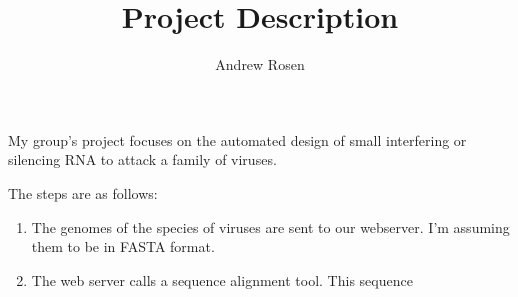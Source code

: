 \documentclass[10pt,a4paper]{article}
\author{Andrew Rosen}
\title{Project Description}
\begin{document}
\maketitle

My group's project focuses on the automated design of small interfering or silencing RNA to attack a family of viruses. 

The steps are as follows:

\begin{enumerate}
	\item The genomes of the species of viruses are sent to our webserver.  
	I'm assuming them to be in FASTA format.
	\item The web server calls a sequence alignment tool.
	This sequence
\end{enumerate}
\end{document}
